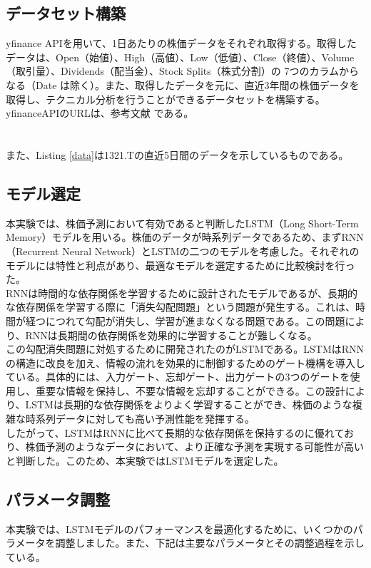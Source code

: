 \documentclass[a4paper, 11pt, titlepage]{jsarticle}
\begin{document}
\subsection{データセット構築}
\indent yfinance APIを用いて、1日あたりの株価データをそれぞれ取得する。取得したデータは、Open（始値）、High（高値）、Low（低値）、Close（終値）、Volume（取引量）、Dividends（配当金）、Stock Splits（株式分割）の 7つのカラムからなる（Date は除く）。また、取得したデータを元に、直近3年間の株価データを取得し、テクニカル分析を行うことができるデータセットを構築する。yfinanceAPIのURLは、参考文献 \cite{yfin}である。\\\\\\
\indent また、Listing \ref{data}は1321.Tの直近5日間のデータを示しているものである。

\subsection{モデル選定}
\indent 本実験では、株価予測において有効であると判断したLSTM（Long Short-Term Memory）モデルを用いる。株価のデータが時系列データであるため、まずRNN（Recurrent Neural Network）とLSTMの二つのモデルを考慮した。それぞれのモデルには特性と利点があり、最適なモデルを選定するために比較検討を行った。\\
\indent RNNは時間的な依存関係を学習するために設計されたモデルであるが、長期的な依存関係を学習する際に「消失勾配問題」という問題が発生する。これは、時間が経つにつれて勾配が消失し、学習が進まなくなる問題である。この問題により、RNNは長期間の依存関係を効果的に学習することが難しくなる。\\
\indent この勾配消失問題に対処するために開発されたのがLSTMである。LSTMはRNNの構造に改良を加え、情報の流れを効果的に制御するためのゲート機構を導入している。具体的には、入力ゲート、忘却ゲート、出力ゲートの3つのゲートを使用し、重要な情報を保持し、不要な情報を忘却することができる。この設計により、LSTMは長期的な依存関係をよりよく学習することができ、株価のような複雑な時系列データに対しても高い予測性能を発揮する。\\
\indent したがって、LSTMはRNNに比べて長期的な依存関係を保持するのに優れており、株価予測のようなデータにおいて、より正確な予測を実現する可能性が高いと判断した。このため、本実験ではLSTMモデルを選定した。

\subsection{パラメータ調整}
\indent 本実験では、LSTMモデルのパフォーマンスを最適化するために、いくつかのパラメータを調整しました。また、下記は主要なパラメータとその調整過程を示している。
\end{document}
